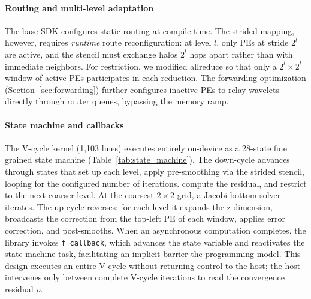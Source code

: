 \documentclass[conference]{IEEEtran}
\begin{document}
            \paragraph{Routing and multi-level adaptation}
                The base SDK configures static routing at compile time. %
                The strided mapping, however, requires \textit{runtime} route reconfiguration: at level $l$, only PEs at stride $2^l$ are active, and the stencil must exchange halos $2^l$ hops apart rather than with immediate neighbors. %
                For restriction, we modified 
                allreduce so that only a $2^l \times 2^l$ window of active PEs participates in each reduction. The forwarding optimization (Section~\ref{sec:forwarding}) further configures inactive PEs to relay wavelets directly through router queues, bypassing the memory ramp.

            \paragraph{State machine and callbacks}
                The V-cycle kernel (1,103 lines) executes entirely on-device as a 28-state fine grained state machine (Table~\ref{tab:state_machine}). The down-cycle advances through states that set up each level, apply pre-smoothing via the strided stencil, 
                looping for the configured number of iterations. compute the residual, %
                and restrict to the next coarser level. %
                At the coarsest $2\times2$ grid, a Jacobi bottom solver iterates. The up-cycle reverses: for each level it expands the z-dimension,
                broadcasts the correction from the top-left PE of each window, %
                applies error correction, %
                and post-smooths. 
                When an asynchronous computation %
                completes, the library invokes \texttt{f\_callback}, which advances the state variable and reactivates the state machine task, facilitating an implicit barrier the programming model. This design executes an entire V-cycle without returning control to the host; the host intervenes only between complete V-cycle iterations to read the convergence residual $\rho$.
\end{document}
